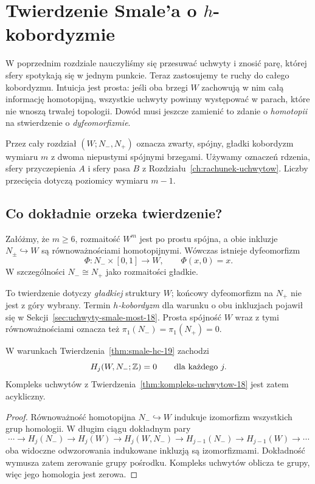 \chapter{Twierdzenie Smale'a o \texorpdfstring{$h$}{h}-kobordyzmie}
\label{ch:hcobordyzm}

W poprzednim rozdziale nauczyliśmy się
przesuwać uchwyty i znosić parę, której
sfery spotykają się w jednym punkcie.
Teraz zastosujemy te ruchy do całego
kobordyzmu. Intuicja jest prosta:
jeśli oba brzegi $W$ zachowują w nim
całą informację homotopijną, wszystkie
uchwyty powinny występować w parach,
które nie wnoszą trwałej topologii.
Dowód musi jeszcze zamienić to zdanie
o \emph{homotopii} na stwierdzenie
o \emph{dyfeomorfizmie}.

Przez cały rozdział $(W;N_-,N_+)$
oznacza zwarty, spójny, gładki
kobordyzm wymiaru $m$ z dwoma
niepustymi spójnymi brzegami.
Używamy oznaczeń rdzenia, sfery
przyczepienia $A$ i sfery pasa $B$
z Rozdziału~\ref{ch:rachunek-uchwytow}.
Liczby przecięcia dotyczą poziomicy
wymiaru $m-1$.

\section{Co dokładnie orzeka twierdzenie?}
\label{sec:stwierdzenie-hc-19}

\begin{twierdzenie}
\label{thm:smale-hc-19}
Załóżmy, że $m\geq6$, rozmaitość
$W^m$ jest po prostu spójna, a obie
inkluzje $N_\pm\hookrightarrow W$
są równoważnościami homotopijnymi.
Wówczas istnieje dyfeomorfizm
\[
 \Phi:N_-\times[0,1]\longrightarrow W,
 \qquad \Phi(x,0)=x.
\]
W szczególności $N_-\cong N_+$
jako rozmaitości gładkie.
\end{twierdzenie}

To twierdzenie dotyczy \emph{gładkiej}
struktury $W$; końcowy dyfeomorfizm
na $N_+$ nie jest z góry wybrany.
Termin \emph{$h$-kobordyzm} dla
warunku o obu inkluzjach pojawił się
w Sekcji~\ref{sec:uchwyty-smale-most-18}.
Prosta spójność $W$ wraz z tymi
równoważnościami oznacza też
$\pi_1(N_-)=\pi_1(N_+)=0$.

\begin{stwierdzenie}[Acykliczność]
\label{prop:acykliczny-hc-19}
W warunkach
Twierdzenia~\ref{thm:smale-hc-19}
zachodzi
\[
 H_j(W,N_-;\mathbb{Z})=0
 \qquad\text{dla każdego }j.
\]
Kompleks uchwytów z
Twierdzenia~\ref{thm:kompleks-uchwytow-18}
jest zatem acykliczny.
\end{stwierdzenie}
\begin{proof}
Równoważność homotopijna
$N_-\hookrightarrow W$ indukuje
izomorfizm wszystkich grup homologii.
W długim ciągu dokładnym pary
\[
 \cdots\to H_j(N_-)\to H_j(W)
 \to H_j(W,N_-)\to H_{j-1}(N_-)
 \to H_{j-1}(W)\to\cdots
\]
oba widoczne odwzorowania indukowane inkluzją
są izomorfizmami. Dokładność wymusza
zatem zerowanie grupy pośrodku.
Kompleks uchwytów oblicza te grupy,
więc jego homologia jest zerowa.
\end{proof}

